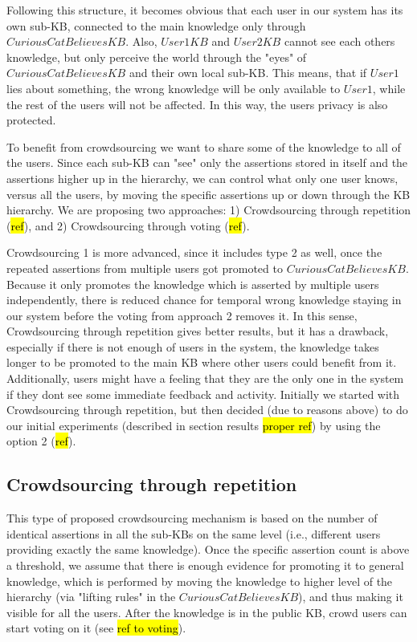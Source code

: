 Following this structure, it becomes obvious that each user in our system has 
its own sub-KB, connected to the main knowledge only through 
$CuriousCatBelievesKB$. Also, $User1KB$ and $User2KB$ cannot see each others 
knowledge, but only perceive the world through the "eyes" of 
$CuriousCatBelievesKB$ and their own local sub-KB. This means, that if $User1$ 
lies about something, the wrong knowledge will be only available to $User1$, 
while the rest of the users will not be affected. In this way, the users privacy
is also protected.

To benefit from crowdsourcing we want to share some of the knowledge to all of 
the users. Since each sub-KB can "see" only the assertions stored in itself and 
the assertions higher up in the hierarchy, we can control what only one user 
knows, versus all the users, by moving the specific assertions up or down 
through the KB hierarchy. 
We are proposing two approaches: 1) Crowdsourcing through repetition (\hl{ref}),
and 2) Crowdsourcing through voting (\hl{ref}).

Crowdsourcing 1 is more advanced, since it includes type 2 as well, once the 
repeated assertions from multiple users got promoted to $CuriousCatBelievesKB$. 
Because it only promotes the knowledge which is asserted by multiple users 
independently, there is reduced chance for temporal wrong knowledge staying in 
our system before the voting from approach 2 removes it. In this sense, 
Crowdsourcing through repetition gives better results, but it has a drawback, 
especially if there is not enough of users in the system, the knowledge takes 
longer to be promoted to the main KB where other users could benefit from it. 
Additionally, users might have a feeling that they are the only one in the 
system if they dont see some immediate feedback and activity. 
Initially we started with Crowdsourcing through repetition, but then 
decided (due to reasons above) to do our initial experiments 
(described in section results \hl{proper ref}) by using the option 2 (\hl{ref}).

\subsection{Crowdsourcing through repetition}
\label{section:crowdRepetition}
This type of proposed crowdsourcing mechanism is based on the number of 
identical assertions in all the sub-KBs on the same level (i.e., different 
users providing exactly the same knowledge). Once the specific assertion count 
is above a threshold, we assume that there is enough evidence for promoting it 
to general knowledge, which is performed by moving the knowledge to higher 
level of the hierarchy (via "lifting rules" in the $CuriousCatBelievesKB$), 
and thus making it visible for all the users. After the knowledge is in the 
public KB, crowd users can start voting on it (see \hl{ref to voting}).

